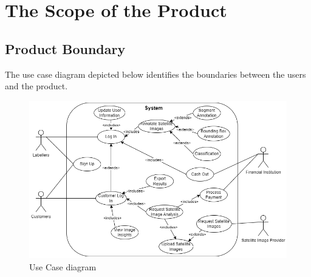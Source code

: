 \documentclass[12pt]{article}
\begin{document}
\section{The Scope of the Product}
\subsection{Product Boundary}
The use case diagram depicted below identifies the boundaries between the users and the product.
\begin{figure}[H]
    \centering
    \includegraphics[scale=0.63]{useCaseDiagram.png}
    \caption{Use Case diagram}
    \label{fig:usecase}
\end{figure}
\newpage
\end{document}
